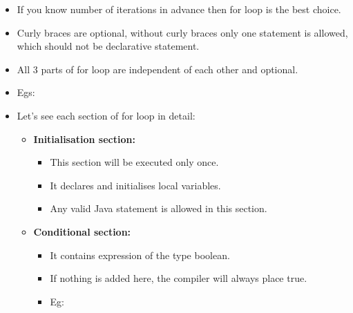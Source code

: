 \setlength{\columnsep}{3pt}
\begin{flushleft}

	\begin{itemize}
		\item If you know number of iterations in advance then for loop is the best choice. 
		
		\item Curly braces are optional, without curly braces only one statement is allowed, which should not be declarative statement.
		\item All 3 parts of for loop are independent of each other and optional.	
		
		\item Egs:
		\bigskip
		\bigskip
		\bigskip
		\item Let's see each section of for loop in detail:
		\begin{itemize}
			\item \textbf{Initialisation section:}
			\begin{itemize}
				\item This section will be executed only once.
				\item It declares and initialises local variables.
				\item Any valid Java statement is allowed in this section.
				\bigskip
				

			\end{itemize}
		
			\item \textbf{Conditional section:}
			\begin{itemize}
				\item It contains expression of the type boolean.
				\item If nothing is added here, the compiler will always place true.
				\item Eg:
				\bigskip
				

\end{itemize}
\end{itemize}
\end{itemize}
\end{flushleft}
